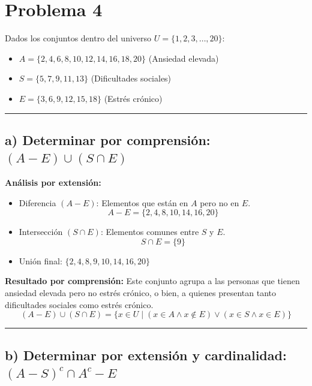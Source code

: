 \documentclass[12pt]{article}
\begin{document}
\section*{Problema 4}
	
	Dados los conjuntos dentro del universo $U = \{1, 2, 3, \dots, 20\}$:
	\begin{itemize}
		\item $A = \{2, 4, 6, 8, 10, 12, 14, 16, 18, 20\}$ (Ansiedad elevada)
		\item $S = \{5, 7, 9, 11, 13\}$ (Dificultades sociales)
		\item $E = \{3, 6, 9, 12, 15, 18\}$ (Estrés crónico)
	\end{itemize}
	
	\hrule
	\vspace{0.4cm}
	
	\subsection*{a) Determinar por comprensión: $(A - E) \cup (S \cap E)$}
	
	\textbf{Análisis por extensión:}
	\begin{itemize}
		\item Diferencia $(A - E)$: Elementos que están en $A$ pero no en $E$.
		\[ A - E = \{2, 4, 8, 10, 14, 16, 20\} \]
		\item Intersección $(S \cap E)$: Elementos comunes entre $S$ y $E$.
		\[ S \cap E = \{9\} \]
		\item Unión final: $\{2, 4, 8, 9, 10, 14, 16, 20\}$
	\end{itemize}
	
	\textbf{Resultado por comprensión:}
	Este conjunto agrupa a las personas que tienen ansiedad elevada pero no estrés crónico, o bien, a quienes presentan tanto dificultades sociales como estrés crónico.
	\[ (A - E) \cup (S \cap E) = \{ x \in U \mid (x \in A \land x \notin E) \lor (x \in S \land x \in E) \} \]
	
	\vspace{0.4cm}
	\hrule
	\vspace{0.4cm}
	
	\subsection*{b) Determinar por extensión y cardinalidad: $(A - S)^c \cap A^c - E$}
	
\end{document}
